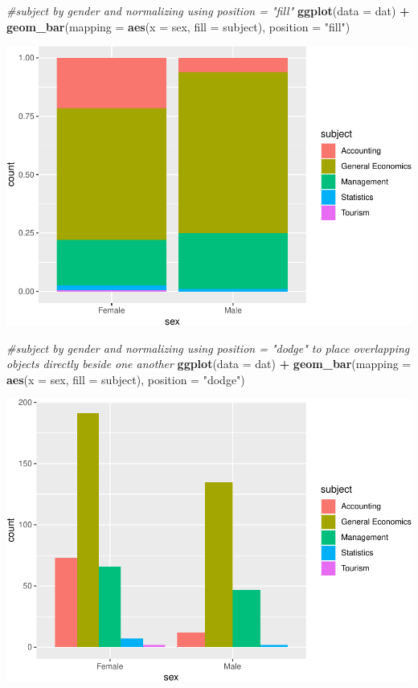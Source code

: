 \documentclass[]{article}
\newenvironment{Shaded}{\begin{snugshade}}{\end{snugshade}}
\newcommand{\CommentTok}[1]{\textcolor[rgb]{0.56,0.35,0.01}{\textit{#1}}}
\newcommand{\DataTypeTok}[1]{\textcolor[rgb]{0.13,0.29,0.53}{#1}}
\newcommand{\KeywordTok}[1]{\textcolor[rgb]{0.13,0.29,0.53}{\textbf{#1}}}
\newcommand{\NormalTok}[1]{#1}
\newcommand{\OperatorTok}[1]{\textcolor[rgb]{0.81,0.36,0.00}{\textbf{#1}}}
\newcommand{\StringTok}[1]{\textcolor[rgb]{0.31,0.60,0.02}{#1}}
\begin{document}
\begin{Shaded}
\begin{Highlighting}[]
\CommentTok{#subject by gender and normalizing using position = "fill"}
\KeywordTok{ggplot}\NormalTok{(}\DataTypeTok{data =}\NormalTok{ dat) }\OperatorTok{+}\StringTok{ }
\StringTok{  }\KeywordTok{geom_bar}\NormalTok{(}\DataTypeTok{mapping =} \KeywordTok{aes}\NormalTok{(}\DataTypeTok{x =}\NormalTok{ sex, }\DataTypeTok{fill =}\NormalTok{ subject), }\DataTypeTok{position =} \StringTok{"fill"}\NormalTok{)}
\end{Highlighting}
\end{Shaded}

\includegraphics{StudentGoals_files/figure-latex/unnamed-chunk-11-6.pdf}

\begin{Shaded}
\begin{Highlighting}[]
\CommentTok{#subject by gender and normalizing using position = "dodge" to place overlapping objects directly beside one another}
\KeywordTok{ggplot}\NormalTok{(}\DataTypeTok{data =}\NormalTok{ dat) }\OperatorTok{+}\StringTok{ }
\StringTok{  }\KeywordTok{geom_bar}\NormalTok{(}\DataTypeTok{mapping =} \KeywordTok{aes}\NormalTok{(}\DataTypeTok{x =}\NormalTok{ sex, }\DataTypeTok{fill =}\NormalTok{ subject), }\DataTypeTok{position =} \StringTok{"dodge"}\NormalTok{)}
\end{Highlighting}
\end{Shaded}

\includegraphics{StudentGoals_files/figure-latex/unnamed-chunk-11-7.pdf}
\end{document}
